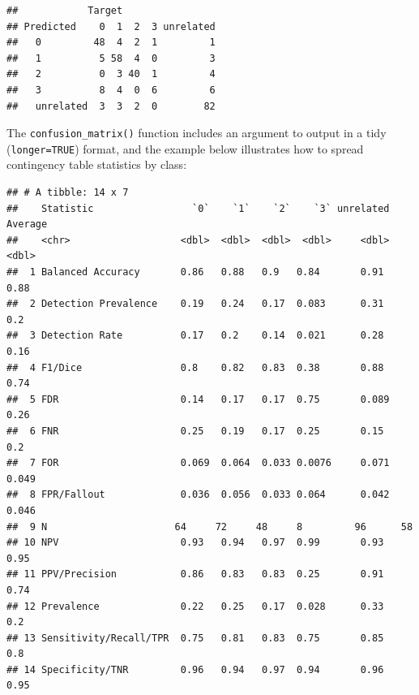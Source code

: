 \documentclass[9pt,a4paper,]{extarticle}
\newenvironment{Shaded}{\begin{snugshade}}{\end{snugshade}}
\newcommand{\AttributeTok}[1]{\textcolor[rgb]{0.77,0.63,0.00}{#1}}
\newcommand{\ConstantTok}[1]{\textcolor[rgb]{0.00,0.00,0.00}{#1}}
\newcommand{\DecValTok}[1]{\textcolor[rgb]{0.00,0.00,0.81}{#1}}
\newcommand{\FunctionTok}[1]{\textcolor[rgb]{0.00,0.00,0.00}{#1}}
\newcommand{\NormalTok}[1]{#1}
\newcommand{\SpecialCharTok}[1]{\textcolor[rgb]{0.00,0.00,0.00}{#1}}
\newcommand{\StringTok}[1]{\textcolor[rgb]{0.31,0.60,0.02}{#1}}
\begin{document}
\begin{verbatim}
##            Target
## Predicted    0  1  2  3 unrelated
##   0         48  4  2  1         1
##   1          5 58  4  0         3
##   2          0  3 40  1         4
##   3          8  4  0  6         6
##   unrelated  3  3  2  0        82
\end{verbatim}

The \texttt{confusion\_matrix()} function includes an argument to output in a tidy (\texttt{longer=TRUE}) format, and the example below illustrates how to spread contingency table statistics by class:

\begin{Shaded}
\end{Shaded}

\begin{verbatim}
## # A tibble: 14 x 7
##    Statistic                 `0`    `1`    `2`    `3` unrelated Average
##    <chr>                   <dbl>  <dbl>  <dbl>  <dbl>     <dbl>   <dbl>
##  1 Balanced Accuracy       0.86   0.88   0.9   0.84       0.91    0.88 
##  2 Detection Prevalence    0.19   0.24   0.17  0.083      0.31    0.2  
##  3 Detection Rate          0.17   0.2    0.14  0.021      0.28    0.16 
##  4 F1/Dice                 0.8    0.82   0.83  0.38       0.88    0.74 
##  5 FDR                     0.14   0.17   0.17  0.75       0.089   0.26 
##  6 FNR                     0.25   0.19   0.17  0.25       0.15    0.2  
##  7 FOR                     0.069  0.064  0.033 0.0076     0.071   0.049
##  8 FPR/Fallout             0.036  0.056  0.033 0.064      0.042   0.046
##  9 N                      64     72     48     8         96      58    
## 10 NPV                     0.93   0.94   0.97  0.99       0.93    0.95 
## 11 PPV/Precision           0.86   0.83   0.83  0.25       0.91    0.74 
## 12 Prevalence              0.22   0.25   0.17  0.028      0.33    0.2  
## 13 Sensitivity/Recall/TPR  0.75   0.81   0.83  0.75       0.85    0.8  
## 14 Specificity/TNR         0.96   0.94   0.97  0.94       0.96    0.95
\end{verbatim}
\end{document}
